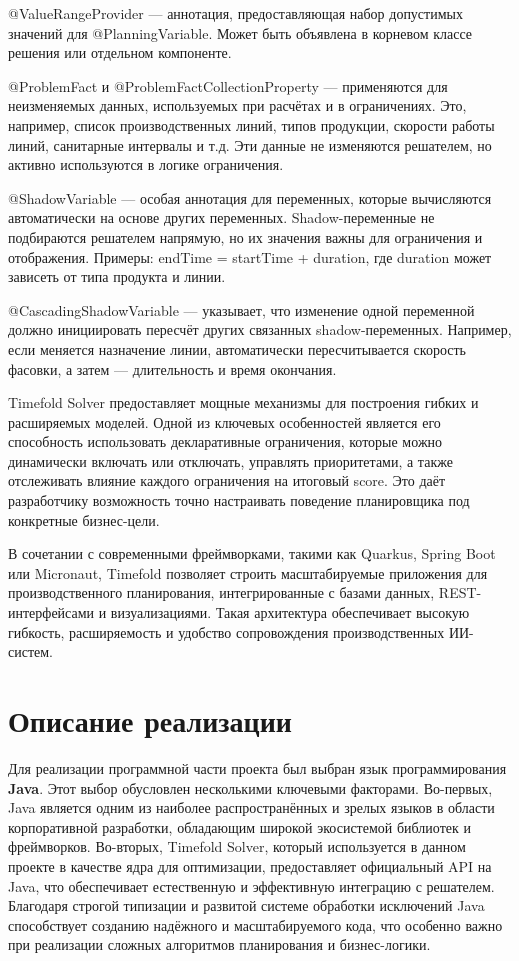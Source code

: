 @ValueRangeProvider — аннотация, предоставляющая набор допустимых значений для @PlanningVariable. Может быть объявлена в корневом классе решения или отдельном компоненте.

@ProblemFact и @ProblemFactCollectionProperty — применяются для неизменяемых данных, используемых при расчётах и в ограничениях. Это, например, список производственных линий, типов продукции, скорости работы линий, санитарные интервалы и т.д. Эти данные не изменяются решателем, но активно используются в логике ограничения.

@ShadowVariable — особая аннотация для переменных, которые вычисляются автоматически на основе других переменных. Shadow-переменные не подбираются решателем напрямую, но их значения важны для ограничения и отображения. Примеры: endTime = startTime + duration, где duration может зависеть от типа продукта и линии.

@CascadingShadowVariable — указывает, что изменение одной переменной должно инициировать пересчёт других связанных shadow-переменных. Например, если меняется назначение линии, автоматически пересчитывается скорость фасовки, а затем — длительность и время окончания.

Timefold Solver предоставляет мощные механизмы для построения гибких и расширяемых моделей. Одной из ключевых особенностей является его способность использовать декларативные ограничения, которые можно динамически включать или отключать, управлять приоритетами, а также отслеживать влияние каждого ограничения на итоговый score. Это даёт разработчику возможность точно настраивать поведение планировщика под конкретные бизнес-цели.

В сочетании с современными фреймворками, такими как Quarkus, Spring Boot или Micronaut, Timefold позволяет строить масштабируемые приложения для производственного планирования, интегрированные с базами данных, REST-интерфейсами и визуализациями. Такая архитектура обеспечивает высокую гибкость, расширяемость и удобство сопровождения производственных ИИ-систем.

\section{Описание реализации}

Для реализации программной части проекта был выбран язык программирования \textbf{Java}. Этот выбор обусловлен несколькими ключевыми факторами. Во-первых, Java является одним из наиболее распространённых и зрелых языков в области корпоративной разработки, обладающим широкой экосистемой библиотек и фреймворков. Во-вторых, Timefold Solver, который используется в данном проекте в качестве ядра для оптимизации, предоставляет официальный API на Java, что обеспечивает естественную и эффективную интеграцию с решателем. Благодаря строгой типизации и развитой системе обработки исключений Java способствует созданию надёжного и масштабируемого кода, что особенно важно при реализации сложных алгоритмов планирования и бизнес-логики.


